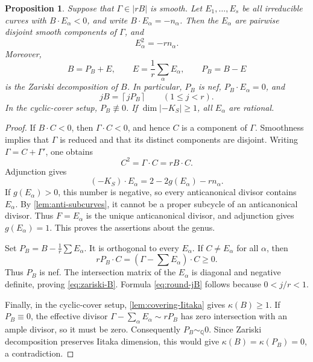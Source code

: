 \documentclass[11pt,reqno]{amsart}
\numberwithin{equation}{section}
\newtheorem{proposition}[proposition]{Proposition}
\theoremstyle{remark}
\newcommand{\ceil}[1]{\left\lceil #1\right\rceil}
\begin{document}
\begin{proposition}\label{prop:fractional-negative}
Suppose that \(\Gamma\in|rB|\) is smooth. Let
\(E_1,\dots,E_s\) be all irreducible curves with
\(B\cdot E_\alpha<0\), and write \(B\cdot E_\alpha=-n_\alpha\).
Then the \(E_\alpha\) are pairwise disjoint smooth components of
\(\Gamma\), and
\[
  E_\alpha^2=-rn_\alpha.
\]
Moreover,
\begin{equation}\label{eq:zariski-B}
 B=P_B+E,\qquad
 E=\frac1r\sum_\alpha E_\alpha,\qquad
 P_B=B-E
\end{equation}
is the Zariski decomposition of \(B\). In particular, \(P_B\) is nef,
\(P_B\cdot E_\alpha=0\), and
\begin{equation}\label{eq:round-jB}
  jB=\ceil{jP_B}\qquad(1\leq j<r).
\end{equation}
In the cyclic-cover setup, \(P_B\not\equiv0\).
If \(\dim|-K_S|\geq1\), all \(E_\alpha\) are rational.
\end{proposition}

\begin{proof}
If \(B\cdot C<0\), then \(\Gamma\cdot C<0\), and hence \(C\) is a
component of \(\Gamma\). Smoothness implies that \(\Gamma\) is reduced
and that its distinct components are disjoint. Writing
\(\Gamma=C+\Gamma'\), one obtains
\[
 C^2=\Gamma\cdot C=rB\cdot C.
\]
Adjunction gives
\[
 (-K_S)\cdot E_\alpha=2-2g(E_\alpha)-rn_\alpha.
\]
If \(g(E_\alpha)>0\), this number is negative, so every
anticanonical divisor contains \(E_\alpha\).
By \cref{lem:anti-subcurves}, it cannot be a proper subcycle of an
anticanonical divisor. Thus \(F=E_\alpha\) is the unique
anticanonical divisor, and adjunction gives \(g(E_\alpha)=1\).
This proves the assertions about the genus.

Set \(P_B=B-\frac1r\sum E_\alpha\). It is orthogonal to every
\(E_\alpha\). If \(C\neq E_\alpha\) for all \(\alpha\), then
\[
 rP_B\cdot C=(\Gamma-\textstyle\sum E_\alpha)\cdot C\geq0.
\]
Thus \(P_B\) is nef. The intersection matrix of the \(E_\alpha\) is
diagonal and negative definite, proving \eqref{eq:zariski-B}.
Formula \eqref{eq:round-jB} follows because \(0<j/r<1\).

Finally, in the cyclic-cover setup,
\cref{lem:covering-Iitaka} gives \(\kappa(B)\geq1\). If
\(P_B\equiv0\), the effective divisor
\(\Gamma-\sum_\alpha E_\alpha\sim rP_B\) has zero intersection
with an ample divisor, so it must be zero. Consequently
\(P_B\sim_{\mathbb Q}0\). Since Zariski decomposition preserves
Iitaka dimension, this would give
\(\kappa(B)=\kappa(P_B)=0\), a contradiction.
\end{proof}
\end{document}
